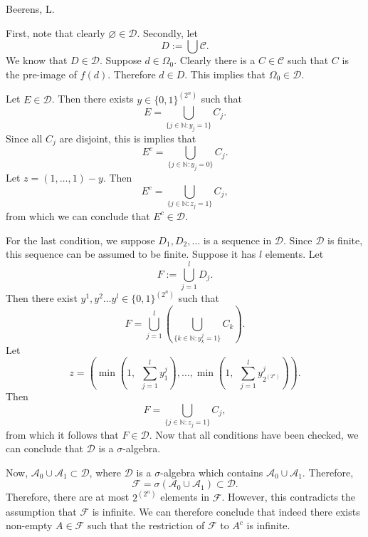 \begin{solution}[2.17]{Beerens, L.}
\begin{itemize}
        First, note that clearly $\varnothing\in\mathcal{D}$. Secondly, let 
        $$
            D:=\bigcup \mathcal{C}.
        $$
        We know that $D\in\mathcal{D}$. Suppose $d\in\Omega_0$. Clearly there is a $C\in\mathcal{C}$ such that $C$ is the pre-image of $f(d)$. Therefore $d\in D$. This implies that $\Omega_0\in\mathcal{D}$.
        
        Let $E\in \mathcal{D}$. Then there exists $y\in\{0,1\}^{(2^n)}$ such that 
        $$
            E = \bigcup_{\{j\in\mathbb{N}:y_j=1\}}C_j.
        $$
        Since all $C_j$ are disjoint, this is implies that
        $$
            E^c = \bigcup_{\{j\in\mathbb{N}:y_j=0\}}C_j.
        $$
        Let $z=(1,\hdots,1)-y$. Then 
        $$
            E^c = \bigcup_{\{j\in\mathbb{N}:z_j=1\}}C_j,
        $$
        from which we can conclude that $E^c\in\mathcal{D}$. 
        
        For the last condition, we suppose $D_1,D_2,\hdots$ is a sequence in $\mathcal{D}$. Since $\mathcal{D}$ is finite, this sequence can be assumed to be finite. Suppose it has $l$ elements. Let 
        $$
            F:=\bigcup_{j=1}^l D_j.
        $$
        Then there exist $y^1,y^2\hdots y^l\in\{0,1\}^{(2^n)}$ such that
        $$
            F = \bigcup_{j=1}^l\left( \bigcup_{\{k\in\mathbb{N}:y^j_k=1\}}C_k \right).
        $$
        Let 
        $$
            z=\left(\min\left(1,\hspace{5pt}\sum_{j=1}^{l}y^j_1 \right),\hdots, \min\left(1,\hspace{5pt}\sum_{j=1}^{l}y^j_{2^{(2^n)}} \right) \right).
        $$
        Then
        $$
            F = \bigcup_{\{j\in\mathbb{N}:z_j=1\}}C_j,
        $$
        from which it follows that $F\in\mathcal{D}$. Now that all conditions have been checked, we can conclude that $\mathcal{D}$ is a $\sigma$-algebra.
        
        Now, $\mathcal{A}_0\cup\mathcal{A}_1\subset\mathcal{D}$, where $\mathcal{D}$ is a $\sigma$-algebra which contains $\mathcal{A}_0\cup\mathcal{A}_1$. Therefore, 
        $$
            \mathcal{F} = \sigma(\mathcal{A}_0\cup\mathcal{A}_1)\subset\mathcal{D}.
        $$
        Therefore, there are at most $2^{(2^n)}$ elements in $\mathcal{F}$. However, this contradicts the assumption that $\mathcal{F}$ is infinite. We can therefore conclude that indeed there exists non-empty $A\in\mathcal{F}$ such that the restriction of $\mathcal{F}$ to $A^c$ is infinite. 
        

\end{itemize}
\end{solution}
